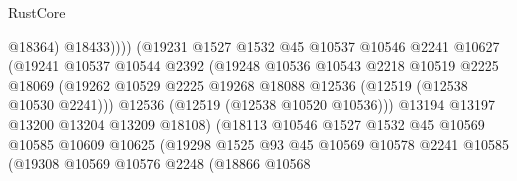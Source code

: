 \begin{lexlean}{RustCore}
\begin{coremodule}
                                          @18364)
                                        @18433))))
                                (@19231
                                  @1527
                                  @1532
                                  @45
                                  @10537
                                  @10546
                                  @2241
                                  @10627
                                  (@19241
                                    @10537
                                    @10544
                                    @2392
                                    (@19248
                                      @10536
                                      @10543
                                      @2218
                                      @10519
                                      @2225
                                      @18069
                                      (@19262
                                        @10529
                                        @2225
                                        @19268
                                        @18088
                                        @12536
                                        (@12519 (@12538 @10530 @2241)))
                                      @12536
                                      (@12519 (@12538 @10520 @10536)))
                                    @13194
                                    @13197
                                    @13200
                                    @13204
                                    @13209
                                    @18108)
                                  (@18113
                                    @10546
                                    @1527
                                    @1532
                                    @45
                                    @10569
                                    @10585
                                    @10609
                                    @10625
                                    (@19298
                                      @1525
                                      @93
                                      @45
                                      @10569
                                      @10578
                                      @2241
                                      @10585
                                      (@19308
                                        @10569
                                        @10576
                                        @2248
                                        (@18866
                                          @10568

\end{coremodule}
\end{lexlean}
